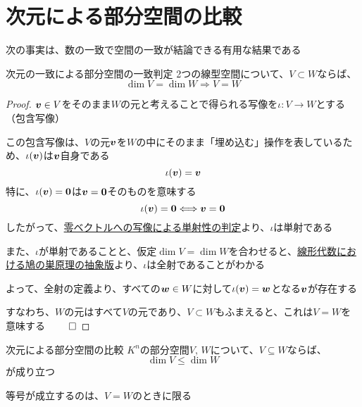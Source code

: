 \documentclass[../../../topic_linear-algebra]{subfiles}
\begin{document}
\sectionline
\section{次元による部分空間の比較}

次の事実は、数の一致で空間の一致が結論できる有用な結果である

\begin{theorem}{次元の一致による部分空間の一致判定}\label{thm:equal-dim-implies-equal-subspace}
  2つの線型空間について、$V \subset W$ならば、
  \begin{equation*}
    \dim V = \dim W \Longrightarrow V = W
  \end{equation*}
\end{theorem}

\begin{proof}
  $\vb*{v} \in V$をそのまま$W$の元と考えることで得られる写像を$\iota \colon V \to W$とする（包含写像）

  \br

  この包含写像は、$V$の元$\vb*{v}$を$W$の中にそのまま「埋め込む」操作を表しているため、$\iota(\vb*{v})$は$\vb*{v}$自身である
  \begin{equation*}
    \iota(\vb*{v}) = \vb*{v}
  \end{equation*}
  特に、$\iota(\vb*{v}) = \vb*{0}$は$\vb*{v} = \vb*{0}$そのものを意味する
  \begin{equation*}
    \iota(\vb*{v}) = \vb*{0} \Longleftrightarrow \vb*{v} = \vb*{0}
  \end{equation*}
  したがって、\hyperref[thm:injective-zero-test]{零ベクトルへの写像による単射性の判定}より、$\iota$は単射である

  \br

  また、$\iota$が単射であることと、仮定$\dim V = \dim W$を合わせると、\hyperref[thm:abstract-linear-pigeonhole]{線形代数における鳩の巣原理の抽象版}より、$\iota$は全射であることがわかる

  \br

  よって、全射の定義より、すべての$\vb*{w} \in W$に対して$\iota(\vb*{v}) = \vb*{w}$となる$\vb*{v}$が存在する

  すなわち、$W$の元はすべて$V$の元であり、$V \subset W$もふまえると、これは$V=W$を意味する $\qed$
\end{proof}

\sectionline

\begin{theorem}{次元による部分空間の比較}
  $K^n$の部分空間$V,\,W$について、$V \subseteq W$ならば、
  \begin{equation*}
    \dim V \leq \dim W
  \end{equation*}
  が成り立つ

  等号が成立するのは、$V = W$のときに限る
\end{theorem}
\end{document}
